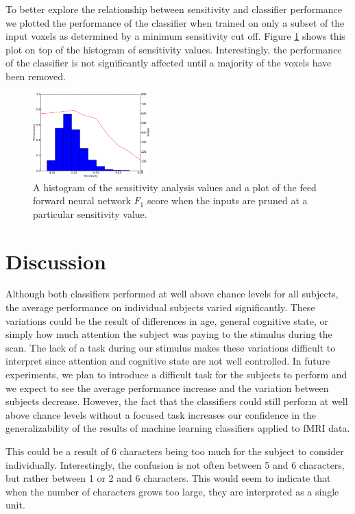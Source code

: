 \documentclass[preprint,5p,authoryear]{elsarticle}
\begin{document}
To better explore the relationship between sensitivity and classifier performance we plotted the performance of the classifier when trained on only a subset of the input voxels as determined by a minimum sensitivity cut off.
Figure \ref{fig:sensitivity-cutoff} shows this plot on top of the histogram of sensitivity values.
Interestingly, the performance of the classifier is not significantly affected until a majority of the voxels have been removed.


\begin{figure}
\centering
\includegraphics[width=0.4\textwidth]{figures/performance-verse-sensitivity-cutoff}
\caption{A histogram of the sensitivity analysis values and a plot of the feed forward neural network $F_1$ score when the inputs are pruned at a particular sensitivity value. }
\label{fig:sensitivity-cutoff}
\end{figure}

\section{Discussion}
Although both classifiers performed at well above chance levels for all subjects, the average performance on individual subjects varied significantly.
These variations could be the result of differences in age, general cognitive state, or simply how much attention the subject was paying to the stimulus during the scan.
The lack of a task during our stimulus makes these variations difficult to interpret since attention and cognitive state are not well controlled.
In future experiments, we plan to introduce a difficult task for the subjects to perform and we expect to see the average performance increase and the variation between subjects decrease.
However, the fact that the classifiers could still perform at well above chance levels without a focused task increases our confidence in the generalizability of the results of machine learning classifiers applied to fMRI data.


This could be a result of 6 characters being too much for the subject to consider individually.
Interestingly, the confusion is not often between 5 and 6 characters, but rather between 1 or 2 and 6 characters.
This would seem to indicate that when the number of characters grows too large, they are interpreted as a single unit.
\end{document}

